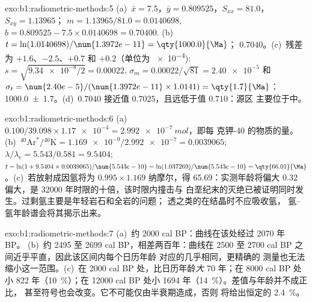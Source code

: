 \begin{solution}{exo:b1:radiometric-methods:5}
(a)~$\bar x = 7.5$，$\bar y = 0.809525$，$S_{xx} = 81.0$，$S_{xy} = 1.13965$；
$m = 1.13965/81.0 = 0.0140698$, $b = 0.809525 - 7.5 \times 0.0140698 = 0.70400$.
(b)~$t = \ln(1.0140698)/\num{1.3972e-11} = \qty{1000.0}{\Ma}$；
$0.7040$。(c)~残差为 $+1.6$、$-2.5$、$+0.7$ 和 $+0.2$（单位为
\num{e-4}): $s = \sqrt{\num{9.34e-8}/2} = 0.00022$, $\sigma_m = 0.00022/\sqrt{81}
= \num{2.40e-5}$ 和 $\sigma_t = \num{2.40e-5}/(\num{1.3972e-11} \times 1.0141) =
\qty{1.7}{\Ma}$：\qty[uncertainty-mode=separate]{1000.0(17)}{\Ma}。(d)~$0.7040$
接近值 $0.7025$，且远低于值 $0.710$：源区
主要位于中。
\end{solution}

\begin{solution}{exo:b1:radiometric-methods:6}
(a)~$0.100/39.098 \times \num{1.17e-4} = \qty{2.992e-7}{mol}$，即每
克钾-40 的物质的量。(b)~${}^{40}\mathrm{Ar}^*/{}^{40}\mathrm{K} = \num{1.169e-9}/\num{2.992e-7}
= 0.0039065$; $\lambda/\lambda_e = 5.543/0.581 = 9.5404$; $t = \ln(1 + 9.5404
\times 0.0039065)/\num{5.543e-10} = \ln(1.037269)/\num{5.543e-10} =
\qty{66.01}{\Ma}$。(c)~若放射成因氩将为 $0.995 \times 1.169$
纳摩尔，得 \qty{65.69}{\Ma}：实测年龄将偏大 \qty{0.32}{\Ma}
偏大，是 \num{32000} 年时限的十倍，该时限内撞击与
白垩纪末的灭绝已被证明同时发生。过剩氩主要是年轻岩石和全岩的问题；
透之类的在结晶时不应吸收氩，
氩–氩年龄谱会将其揭示出来。
\end{solution}

\begin{solution}{exo:b1:radiometric-methods:7}
(a)~约 \num{2000} cal BP：曲线在该处经过 \num{2070} 年 BP。
(b)~约 \num{2495} 至 \num{2699} cal BP，相差两百年：曲线在
\num{2500} 至 \num{2700} cal BP 之间近乎平直，因此该区间内每个日历年龄
对应的几乎相同，更精确的
测量也无法缩小这一范围。(c)~在 \num{2000} cal BP 处，比日历年龄\emph{大} \num{70} 年；在 \num{8000} cal BP 处
小 \num{822} 年（\qty{10}{\percent}）；在 \num{12000} cal BP 处小 \num{1694}
年（\qty{14}{\percent}）。差值与年龄并不成正比，
甚至符号也会改变。它不可能仅由半衰期造成，否则
将给出恒定的 \qty{2.4}{\percent}。
\end{solution}

